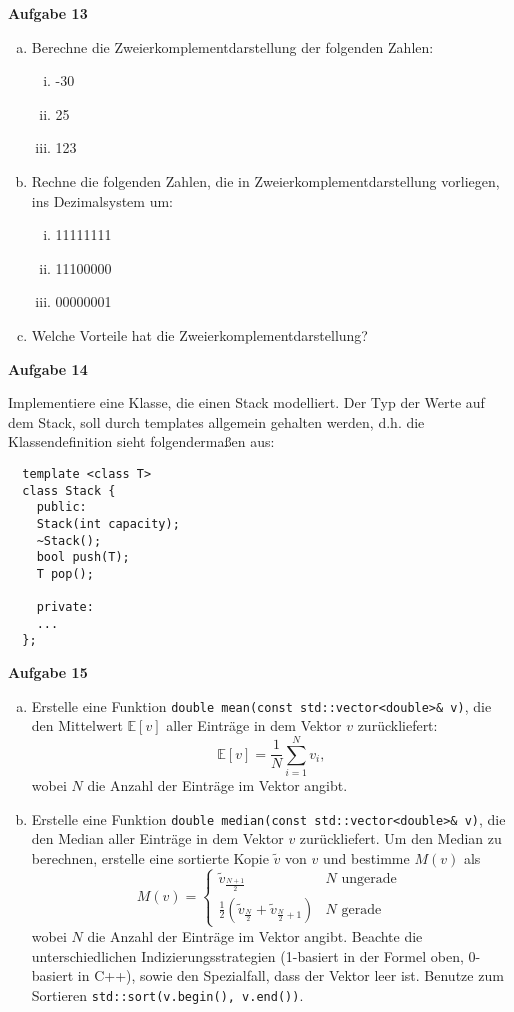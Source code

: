 \documentclass[a4paper,12pt,parskip=full]{scrartcl}
\newcommand{\Aufgabe}[1]{
  {
    \vspace*{0.5cm}
    \textsf{\textbf{Aufgabe #1}}
    \vspace*{0.2cm}
    
  }
}
\begin{document}
\Aufgabe{13}
\begin{enumerate}[a)]
\item Berechne die Zweierkomplementdarstellung der folgenden Zahlen:
  \begin{enumerate}[i)]
  \item -30
  \item 25
  \item 123
  \end{enumerate}

\item Rechne die folgenden Zahlen, die in Zweierkomplementdarstellung
  vorliegen, ins Dezimalsystem um:
  \begin{enumerate}[i)]
  \item 11111111
  \item 11100000
  \item 00000001
  \end{enumerate}

\item Welche Vorteile hat die Zweierkomplementdarstellung?
\end{enumerate}

\Aufgabe{14} Implementiere eine Klasse, die einen Stack
modelliert. Der Typ der Werte auf dem Stack, soll durch templates
allgemein gehalten werden, d.h. die Klassendefinition sieht
folgendermaßen aus:
\begin{lstlisting}
  template <class T>
  class Stack {
    public:
    Stack(int capacity);
    ~Stack();
    bool push(T);
    T pop();

    private:
    ...
  };
\end{lstlisting}

\Aufgabe{15}
\begin{enumerate}[a)]
\item Erstelle eine Funktion \lstinline{double mean(const std::vector<double>& v)}, die den Mittelwert $\mathbb{E}[v]$ aller
  Einträge in dem Vektor $v$ zurückliefert:
  $$
  \mathbb{E}[v] = \frac{1}{N} \sum\limits_{i=1}^N{v_i},
  $$
  wobei $N$ die Anzahl der Einträge im Vektor angibt.
\item Erstelle eine Funktion \lstinline{double median(const std::vector<double>& v)}, die den Median aller Einträge in dem
  Vektor $v$ zurückliefert. Um den Median zu berechnen, erstelle eine
  sortierte Kopie $\tilde{v}$ von $v$ und bestimme $M(v)$ als
  $$
  M(v) =
  \begin{cases}
    \tilde{v}_{\frac{N+1}{2}} & N \text{ ungerade } \\
    \frac{1}{2} ( \tilde{v}_{\frac{N}{2}} + \tilde{v}_{\frac{N}{2}+1}
    ) & N \text{ gerade }
  \end{cases}
  $$
  wobei $N$ die Anzahl der Einträge im Vektor angibt. Beachte die
  unterschiedlichen Indizierungsstrategien (1-basiert in der Formel
  oben, 0-basiert in C++), sowie den Spezialfall, dass der Vektor leer
  ist. Benutze zum Sortieren \lstinline{std::sort(v.begin(), v.end())}.
\end{enumerate}
\end{document}

